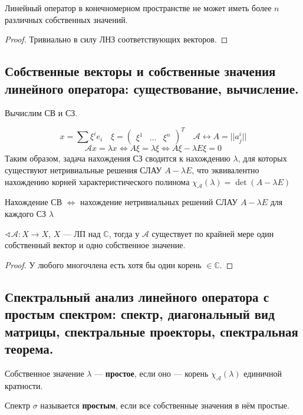 \begin{lemma}
    Линейный оператор в конечномерном пространстве не может иметь более $n$ различных собственных значений.
\end{lemma}
\begin{proof}
    Тривиально в силу ЛНЗ соответствующих векторов.
\end{proof}

\subsection{Собственные векторы и собственные значения линейного оператора: существование, вычисление. }

Вычислим СВ и СЗ.

$$x = \sum \xi^i e_i \quad \xi = \begin{pmatrix}
        \xi^1 & \ldots & \xi^n
    \end{pmatrix}^T \quad \mathcal A \leftrightarrow A = ||a^i_j||$$
$$\mathcal A x = \lambda x \Leftrightarrow A \xi = \lambda \xi \Leftrightarrow A \xi - \lambda E \xi = 0$$
Таким образом, задача нахождения СЗ сводится к нахождению $\lambda$, для которых существуют нетривиальные решения СЛАУ $A-\lambda E$, что эквивалентно нахождению корней характеристического полинома $\chi_{\mathcal A}(\lambda) = \det(A - \lambda E)$

Нахождение СВ $\Leftrightarrow$ нахождение нетривиальных решений СЛАУ $A - \lambda E$ для каждого СЗ $\lambda$

\begin{lemma}
    $\sphericalangle \mathcal A : X \to X$, $X$ --- ЛП над $\mathbb{C}$, тогда у $\mathcal A$ существует по крайней мере один собственный вектор и одно собственное значение.
\end{lemma}
\begin{proof}
    У любого многочлена есть хотя бы один корень $\in \mathbb{C}$.
\end{proof}

\subsection{Спектральный анализ линейного оператора с простым спектром: спектр, диагональный вид матрицы, спектральные проекторы, спектральная теорема.}
\begin{definition}
    Собственное значение $\lambda$ --- \textbf{простое}, если оно --- корень $\chi_{\mathcal A}(\lambda)$ единичной кратности.
\end{definition}
\begin{definition}
    Спектр $\sigma$ называется \textbf{простым}, если все собственные значения в нём простые.
\end{definition}

